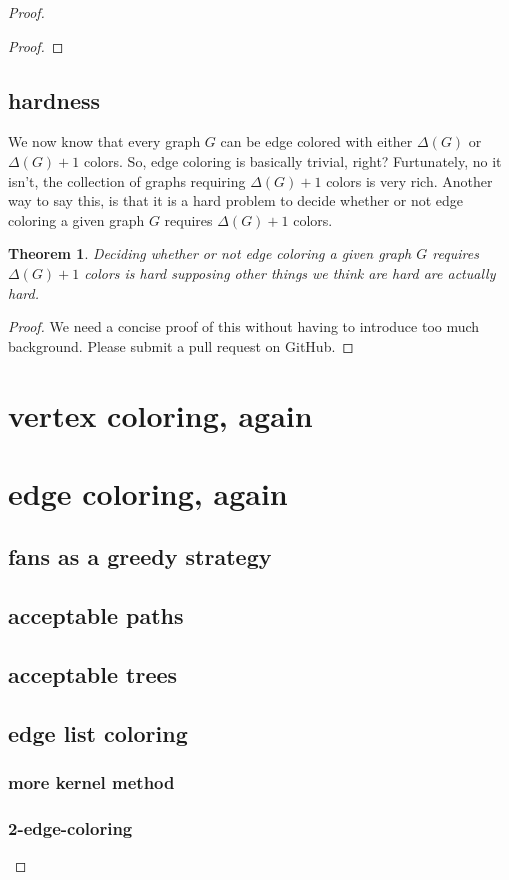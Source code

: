 \documentclass{amsbook}
\theoremstyle{plain}
\newtheorem{theorem}{Theorem}
\numberwithin{equation}{chapter}
\begin{document}
\begin{proof}
\begin{proof}
\end{proof}

\section*{hardness}
We now know that every graph $G$ can be edge colored with either $\Delta(G)$ or $\Delta(G) + 1$ colors.  So, edge coloring is basically trivial, right?
Furtunately, no it isn't, the collection of graphs requiring $\Delta(G) + 1$ colors is very rich.  Another way to say this, is that it is a hard problem
to decide whether or not edge coloring a given graph $G$ requires $\Delta(G) + 1$ colors.  

\begin{theorem}
Deciding whether or not edge coloring a given graph $G$ requires $\Delta(G) + 1$ colors is hard supposing other things we think are hard are actually hard.
\end{theorem}
\begin{proof}
We need a concise proof of this without having to introduce too much background.  Please submit a pull request on GitHub.
\end{proof}

\chapter*{vertex coloring, again}
\chapter*{edge coloring, again}
\section*{fans as a greedy strategy}
\section*{acceptable paths}
\section*{acceptable trees}
\section*{edge list coloring}
\subsection*{more kernel method}
\subsection*{2-edge-coloring}

\end{proof}
\end{document}
